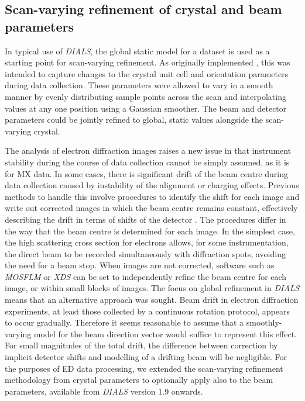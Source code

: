 \documentclass[preprint]{iucr}
\newcommand{\dials}{\emph{DIALS}\xspace}
\newcommand{\xds}{\emph{XDS}\xspace}
\newcommand{\mosflm}{\emph{MOSFLM}\xspace}
\begin{document}
\subsection{Scan-varying refinement of crystal and beam parameters
\label{sec:sv-refinement}}

In typical use of \dials, the global static model for a dataset is used as a
starting point for scan-varying refinement. As originally implemented
\cite{Waterman2016}, this was intended to capture changes to the crystal unit
cell and orientation parameters during data collection. These parameters were
allowed to vary in a smooth manner by evenly distributing sample points across
the scan and interpolating values at any one position using a Gaussian
smoother. The beam and detector parameters could be jointly refined to global,
static values alongside the scan-varying crystal.

The analysis of electron
diffraction images raises a new issue in that instrument stability during the
course of data collection cannot be simply assumed, as it is for MX data. In
some cases, there is significant drift of the beam centre during data
collection caused by instability of the alignment or charging effects.
Previous methods to handle this involve procedures to identify the shift
for each image and write out corrected images in which the beam centre remains
constant, effectively describing the drift in terms of shifts of the detector
\cite{Wan2013,Nederlof2013,Hattne2015}. The procedures differ in the
way that the beam centre is determined for each image. In the simplest case,
the high scattering cross section for electrons allows, for some
instrumentation, the direct beam to be
recorded simultaneously with diffraction spots, avoiding the need for a beam
stop. When images are not corrected,
software such as \mosflm or \xds can be set to independently refine the beam
centre for each image, or within small blocks of images.
The focus on global refinement in \dials means that an alternative approach was
sought. Beam drift in electron diffraction experiments, at least those
collected by a continuous rotation protocol, appears to occur gradually.
Therefore it seems reasonable to assume that a smoothly-varying model for the
beam direction vector would suffice to represent this effect. For small
magnitudes of the total drift, the difference between correction by implicit
detector shifts and modelling of a drifting beam will be negligible. For the
purposes of ED data processing, we extended the scan-varying refinement
methodology from crystal parameters to optionally apply also to the beam
parameters, available from \dials version 1.9 onwards.
\end{document}
